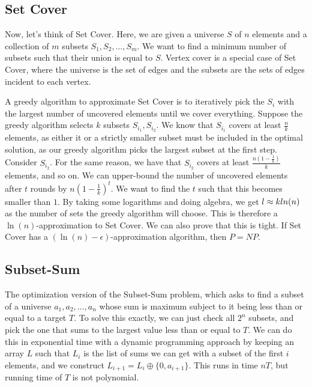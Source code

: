 \subsection*{Set Cover}

Now, let's think of Set Cover.  Here, we are given a universe $S$ of $n$ elements and a collection of $m$ subsets $S_1,S_2,\dots, S_m$.  We want to find a minimum number of subsets such that their union is equal to $S$.  Vertex cover is a special case of Set Cover, where the universe is the set of edges and the subsets are the sets of edges incident to each vertex.

A greedy algorithm to approximate Set Cover is to iteratively pick the $S_i$ with the largest number of uncovered elements until we cover everything.  Suppose the greedy algorithm selects $k$ subsets $S_{i_1},S_{i_2}$.  We know that $S_{i_1}$ covers at least $\frac{n}{k}$ elements, as either it or a strictly smaller subset must be included in the optimal solution, as our greedy algorithm picks the largest subset at the first step.  Consider $S_{i_2}$.  For the same reason, we have that $S_{i_2}$ covers at least $\frac{n(1-\frac{1}{k})}{k}$ elements, and so on.  We can upper-bound the number of uncovered elements after $t$ rounds by $n(1-\frac{1}{k})^t$.  We want to find the $t$ such that this becomes smaller than $1$.  By taking some logarithms and doing algebra, we get $l\approx k\\ln(n)$ as the number of sets the greedy algorithm will choose.  This is therefore a $\ln(n)$-approximation to Set Cover.  We can also prove that this is tight.  If Set Cover has a $(\ln(n)-\epsilon)$-approximation algorithm, then $P=NP$.

\subsection*{Subset-Sum}

The optimization version of the Subset-Sum problem, which asks to find a subset of a universe $a_1,a_2,\dots,a_n$ whose sum is maximum subject to it being less than or equal to a target $T$.  To solve this exactly, we can just check all $2^n$ subsets, and pick the one that sums to the largest value less than or equal to $T$.  We can do this in exponential time with a dynamic programming approach by keeping an array $L$ such that $L_i$ is the list of sums we can get with a subset of the first $i$ elements, and we construct $L_{i+1}=L_i \oplus \{0,a_{i+1}\}$.  This runs in time $nT$, but running time of $T$ is not polynomial.

